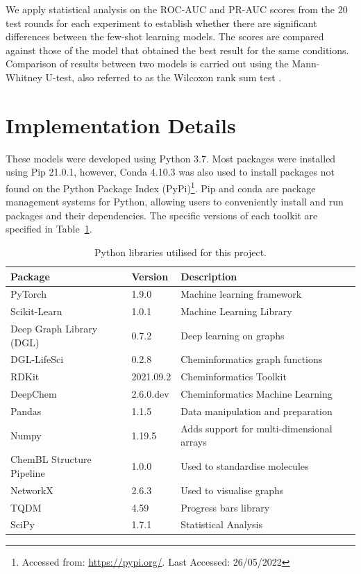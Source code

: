 We apply statistical analysis on the ROC-AUC and PR-AUC scores from the 20 test rounds for each experiment to establish whether there are significant differences between the few-shot learning models. The scores are compared against those of the model that obtained the best result for the same conditions. Comparison of results between two models is carried out using the Mann-Whitney U-test, also referred to as the Wilcoxon rank sum test \citep{mann1947test}.

\section{Implementation Details}

These models were developed using Python 3.7. Most packages were installed using Pip 21.0.1, however, Conda 4.10.3 was also used to install packages not found on the Python Package Index (PyPi)\footnote{Accessed from: \url{https://pypi.org/}. Last Accessed: 26/05/2022}. Pip and conda are package management systems for Python, allowing users to conveniently install and run packages and their dependencies. The specific versions of each toolkit are specified in Table~\ref{tab:versions}.

\begin{table}
	\centering
	\begin{tabular}{@{}lll@{}}
		\hline
		\textbf{Package} & \textbf{Version} & \textbf{Description} \\
		\hline
		PyTorch & 1.9.0 & Machine learning framework \\
		Scikit-Learn & 1.0.1 & Machine Learning Library \\
		Deep Graph Library (DGL) & 0.7.2 & Deep learning on graphs \\
		DGL-LifeSci & 0.2.8 & Cheminformatics graph functions \\
		RDKit & 2021.09.2 & Cheminformatics Toolkit \\
		DeepChem & 2.6.0.dev & Cheminformatics Machine Learning \\
		Pandas & 1.1.5 & Data manipulation and preparation \\
		Numpy & 1.19.5 & Adds support for multi-dimensional arrays \\
		ChemBL Structure Pipeline & 1.0.0 & Used to standardise molecules \\
		NetworkX & 2.6.3 & Used to visualise graphs \\
		TQDM & 4.59 & Progress bars library \\
		SciPy & 1.7.1 & Statistical Analysis \\
		\hline
	\end{tabular}
	\caption{Python libraries utilised for this project.}
	\label{tab:versions}
\end{table}

